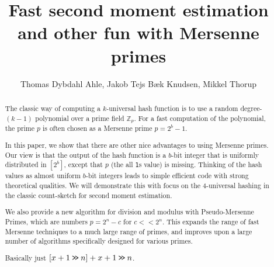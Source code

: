 

\title{Fast second moment estimation and other fun with Mersenne primes} 
\author{Thomas Dybdahl Ahle, Jakob Tejs Bæk Knudsen, Mikkel Thorup}

\maketitle

\begin{abstract}
The classic way of computing a $k$-universal hash function is
to use a random degree-$(k-1)$ polynomial over a prime field $\mathbb Z_p$.
For a fast computation of the polynomial, the prime $p$ is often
chosen as a Mersenne prime $p=2^b-1$.

In this paper, we show that there are other nice advantages to using
Mersenne primes. Our view is that the output of the hash function is a
$b$-bit integer that is uniformly distributed in $[2^b]$, except that
$p$ (the all \texttt1s value) is missing. Thinking of the hash
values as almost uniform $b$-bit integers leads to simple efficient code 
with strong theoretical qualities. We will demonstrate this with focus on the
4-universal hashing in the classic count-sketch for second moment
estimation.

We also provide a new algorithm for division and modulus with Pseudo-Mersenne Primes, which are numbers $p=2^n-c$ for $c<\!< 2^n$.
This expands the range of fast Mersenne techniques to a much large range of primes, and improves upon a large number of algorithms specifically designed for various primes.

Basically just
   $[x+1 \mathbin{\texttt{>\!>}} n]+x+1 \mathbin{\texttt{>\!>}} n$.
\end{abstract}

\tableofcontents



















